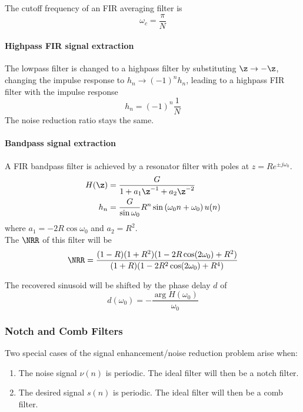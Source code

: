 The cutoff frequency of an FIR averaging filter is
\begin{equation*}
	\omega_c = \frac{\pi}{N}
\end{equation*}

\paragraph{Highpass FIR signal extraction}
The lowpass filter is changed to a highpass filter by substituting $\z \to -\z$,
changing the impulse response to $h_n \to (-1)^n h_n$, leading to
a highpass FIR filter with the impulse response
\begin{equation*}
	h_n = (-1)^n \frac{1}{N}
\end{equation*}
The noise reduction ratio stays the same.

\paragraph{Bandpass signal extraction}
A FIR bandpass filter is achieved by a resonator filter with poles at $z = R e^{\pm j \omega_0}$.
\begin{align*}
	H(\z) &= \frac{G}{1 + a_1 \z^{-1} + a_2 \z^{-2}} \\
	h_n &= \frac{G}{\sin \omega_0} R^n \sin\left(\omega_0 n + \omega_0\right) u(n)
\end{align*}
where $a_1 = -2R \cos\omega_0$ and $a_2 = R^2$. \\

The $\NRR$ of this filter will be
\begin{equation*}
	\NRR= \frac{(1-R)(1+R^2)(1-2R\cos(2\omega_0)+R^2)}{(1+R)(1-2R^2\cos(2\omega_0)+R^4)}
\end{equation*}

The recovered sinusoid will be shifted by the phase delay $d$ of
\begin{equation*}
	d(\omega_0) = - \frac{\arg H(\omega_0)}{\omega_0}
\end{equation*}


\subsubsection{Notch and Comb Filters}

Two special cases of the signal enhancement/noise reduction problem arise when:
\begin{enumerate}
	\item The noise signal $\nu(n)$ is periodic. The ideal filter will then
	be a notch filter.
	\item The desired signal $s(n)$ is periodic. The ideal filter will then
	be a comb filter.
\end{enumerate}


